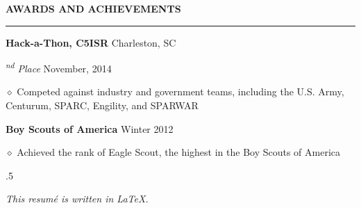 \documentclass[executivepaper]{extarticle}
\begin{document}
\begin{center}
{\begin{minipage}{7.0in}
{\noindent \textbf{\fontsize{12}{9}\selectfont AWARDS AND ACHIEVEMENTS}}

\vspace{-3mm}

\noindent \rule{\textwidth}{0.5pt}

\vspace{1mm}

{\noindent \textbf{\fontsize{12}{8}\selectfont Hack-a-Thon, C5ISR}} {\hfill \fontsize{10}{8}\selectfont Charleston, SC}

{\noindent \textit{\fontsize{12}{8}\textsuperscript{nd} Place}} {\hfill \fontsize{10}{8}\selectfont November, 2014}

\vspace{1mm}

{\noindent $\diamond$ {\fontsize{12}{8}\selectfont Competed against industry and government teams, including the U.S. Army, Centurum, SPARC, Engility, and SPARWAR}}

\vspace{2mm}

{\noindent \textbf{\fontsize{12}{8}\selectfont Boy Scouts of America}} {\hfill \fontsize{10}{8}\selectfont Winter 2012}

\vspace{1mm}

{\noindent $\diamond$ {\fontsize{12}{8}\selectfont Achieved the rank of Eagle Scout, the highest in the Boy Scouts of America}}

\vspace{5mm}



\moveleft.5\hoffset\centerline{{\large\sl This resumé is written in \LaTeX.}}

\end{minipage}

}

\end{center}
\end{document}
